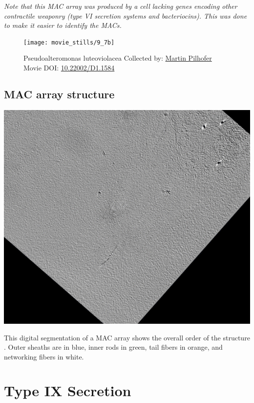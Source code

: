 \documentclass[]{tufte-book}
\begin{document}
\emph{Note that this MAC array was produced by a cell lacking genes
encoding other contractile weaponry (type VI secretion systems and
bacteriocins). This was done to make it easier to identify the MACs.}





\begin{figure}
\texttt{[image: movie\_stills/9\_7b]} \caption[Pseudoalteromonas luteoviolacea Collected by:
\protect\hyperlink{martin_pilhofer}{Martin Pilhofer} Movie DOI:
\href{https://doi.org/10.22002/D1.1584}{10.22002/D1.1584}]{Pseudoalteromonas luteoviolacea Collected by:
\protect\hyperlink{martin_pilhofer}{Martin Pilhofer} Movie DOI:
\href{https://doi.org/10.22002/D1.1584}{10.22002/D1.1584}}\label{fig:9-7b}
\end{figure}

\subsection{MAC array structure}\label{MAC_array_structure}

\includegraphics{img/schematics/9_7_2}

This digital segmentation of a MAC array shows the overall order of the
structure \citep{shikuma2014}. Outer sheaths are in blue, inner rods in
green, tail fibers in orange, and networking fibers in white.

\section{Type IX Secretion}\label{type-ix-secretion}
\end{document}
